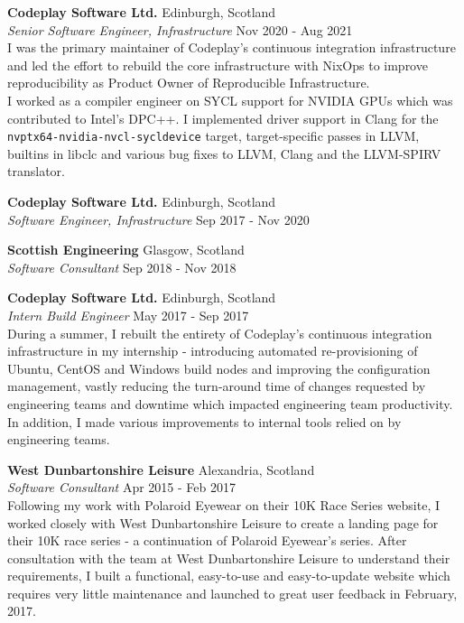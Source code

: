 \documentclass[a4paper]{article}
\begin{document}
\textbf{Codeplay Software Ltd.} \hfill {\color{gray} Edinburgh, Scotland} \\
\textit{Senior Software Engineer, Infrastructure} \hfill {\color{gray} Nov 2020 - Aug 2021} \\
\vspace{2mm}
I was the primary maintainer of Codeplay's continuous integration infrastructure and led the effort
to rebuild the core infrastructure with NixOps to improve reproducibility as Product
Owner of Reproducible Infrastructure. \\
\vspace{2mm}
I worked as a compiler engineer on SYCL support for NVIDIA GPUs which was contributed to Intel's
DPC++. I implemented driver support in Clang for the \verb|nvptx64-nvidia-nvcl-sycldevice| target,
target-specific passes in LLVM, builtins in libclc and various bug fixes to LLVM, Clang and the
LLVM-SPIRV translator.
\vspace{2mm}

\textbf{Codeplay Software Ltd.} \hfill {\color{gray} Edinburgh, Scotland} \\
\textit{Software Engineer, Infrastructure} \hfill {\color{gray} Sep 2017 - Nov 2020} \\
\vspace{2mm}

\textbf{Scottish Engineering} \hfill {\color{gray} Glasgow, Scotland} \\
\textit{Software Consultant} \hfill {\color{gray} Sep 2018 - Nov 2018} \\
\vspace{2mm}

\textbf{Codeplay Software Ltd.} \hfill {\color{gray} Edinburgh, Scotland} \\
\textit{Intern Build Engineer} \hfill {\color{gray} May 2017 - Sep 2017} \\
\vspace{2mm}
During a summer, I rebuilt the entirety of Codeplay's continuous integration infrastructure
in my internship - introducing automated re-provisioning of Ubuntu, CentOS and Windows build nodes
and improving the configuration management, vastly reducing the turn-around time of changes
requested by engineering teams and downtime which impacted engineering team productivity. In
addition, I made various improvements to internal tools relied on by engineering teams.
\vspace{2mm}

\textbf{West Dunbartonshire Leisure} \hfill {\color{gray} Alexandria, Scotland} \\
\textit{Software Consultant} \hfill {\color{gray} Apr 2015 - Feb 2017} \\
\vspace{2mm}
Following my work with Polaroid Eyewear on their 10K Race Series website, I worked closely with
West Dunbartonshire Leisure to create a landing page for their 10K race series - a continuation of
Polaroid Eyewear’s series. After consultation with the team at West Dunbartonshire Leisure to
understand their requirements, I built a functional, easy-to-use and easy-to-update website which
requires very little maintenance and launched to great user feedback in February, 2017.
\vspace{2mm}
\end{document}
